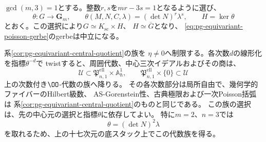\begin{corollary}[指標による次数線形化の降下]
\label{cor:pg-equivariant-character-descent}
$\gcd(m,3)=1$とする。整数$r,s$を$mr-3s=1$となるように選び、
\begin{equation}
 \theta:G\longrightarrow\mathbf G_m,
 \qquad \theta(M,N,C,\lambda)=(\det N)^r\lambda^s,
 \qquad H=\ker\theta
 \label{eq:pg-equivariant-scalar-character}
\end{equation}
とおく。この選択により$G\simeq K_{\mathrm{sc}}\times H$、
$H\simeq\overline G$となり、
\eqref{eq:pg-equivariant-poisson-gerbe}のgerbeは中立になる。

系\ref{cor:pg-equivariant-central-quotient}の族を
$\eta\ne0$へ制限する。各次数$d$の線形化を指標$\theta^{-d}$で
twistすると、周囲代数、中心三次イデアルおよびその商は、
\begin{equation}
 \mathcal U\subset
 \mathfrak P_{n,1}^{\mathrm{ell}}\times\mathbb A^1_\hbar,
 \qquad
 \mathfrak P_{n,1}^{\mathrm{ell}}\times\{0\}\subset\mathcal U
 \label{eq:pg-equivariant-rigidified-family-base}
\end{equation}
上の次数付き$\OO$-代数の族へ降りる。
その各次数部分は局所自由で、幾何学的ファイバーのHilbert級数、
AS-Gorenstein性、古典極限および一次Poisson括弧は
系\ref{cor:pg-equivariant-central-quotient}のものと同じである。
この族の選択は、先の中心元の選択と指標$\theta$に依存してよい。
特に$m=2$、$n=3$では
\begin{equation}
 \theta=(\det N)^2\lambda
 \label{eq:pg-equivariant-threefold-character}
\end{equation}
を取れるため、上の十七次元の底スタック上でこの代数族を得る。
\end{corollary}
